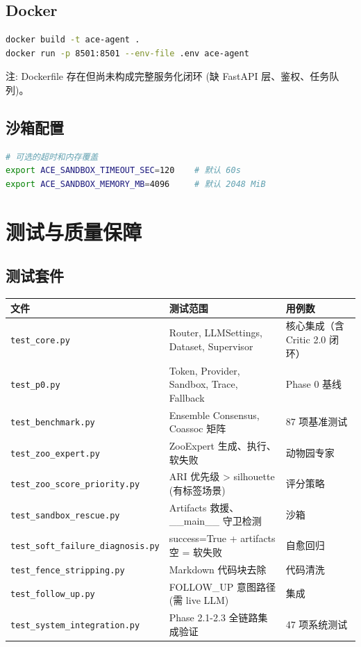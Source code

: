 \documentclass[12pt,a4paper]{article}
\begin{document}
\subsection{Docker}

\begin{lstlisting}[language=bash]
docker build -t ace-agent .
docker run -p 8501:8501 --env-file .env ace-agent
\end{lstlisting}

注: Dockerfile 存在但尚未构成完整服务化闭环 (缺 FastAPI 层、鉴权、任务队列)。

\subsection{沙箱配置}

\begin{lstlisting}[language=bash]
# 可选的超时和内存覆盖
export ACE_SANDBOX_TIMEOUT_SEC=120    # 默认 60s
export ACE_SANDBOX_MEMORY_MB=4096     # 默认 2048 MiB
\end{lstlisting}

\newpage

\section{测试与质量保障}

\subsection{测试套件}

\begin{table}[H]
\centering
\begin{tabular}{@{}lp{3.5cm}p{5cm}@{}}
\toprule
\textbf{文件} & \textbf{测试范围} & \textbf{用例数} \\
\midrule
\texttt{test\_core.py} & Router, LLMSettings, Dataset, Supervisor & 核心集成（含 Critic 2.0 闭环）\\
\texttt{test\_p0.py} & Token, Provider, Sandbox, Trace, Fallback & Phase 0 基线 \\
\texttt{test\_benchmark.py} & Ensemble Consensus, Coassoc 矩阵 & 87 项基准测试 \\
\texttt{test\_zoo\_expert.py} & ZooExpert 生成、执行、软失败 & 动物园专家 \\
\texttt{test\_zoo\_score\_priority.py} & ARI 优先级 > silhouette (有标签场景) & 评分策略 \\
\texttt{test\_sandbox\_rescue.py} & Artifacts 救援、\_\_main\_\_ 守卫检测 & 沙箱 \\
\texttt{test\_soft\_failure\_diagnosis.py} & success=True + artifacts 空 = 软失败 & 自愈回归 \\
\texttt{test\_fence\_stripping.py} & Markdown 代码块去除 & 代码清洗 \\
\texttt{test\_follow\_up.py} & FOLLOW\_UP 意图路径 (需 live LLM) & 集成 \\
\texttt{test\_system\_integration.py} & Phase 2.1-2.3 全链路集成验证 & 47 项系统测试 \\
\bottomrule
\end{tabular}
\end{table}
\end{document}
